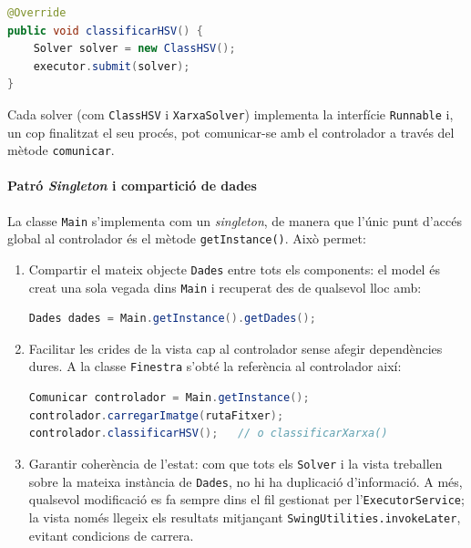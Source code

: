 \documentclass{ieeetj}
\begin{document}
\begin{lstlisting}[language=Java]
@Override
public void classificarHSV() {
    Solver solver = new ClassHSV();
    executor.submit(solver);
}
\end{lstlisting}

Cada solver (com \texttt{ClassHSV} i \texttt{XarxaSolver}) implementa la interfície \texttt{Runnable} i, un cop finalitzat el seu procés, pot comunicar-se amb el controlador a través del mètode \texttt{comunicar}.

\paragraph{Patró \emph{Singleton} i compartició de dades}

La classe \texttt{Main} s’implementa com un \emph{singleton}, de manera que
l’únic punt d’accés global al controlador és el mètode
\texttt{getInstance()}.  
Això permet:

\begin{enumerate}
  \item Compartir el mateix objecte \texttt{Dades} entre tots els components:
        el model és creat una sola vegada dins \texttt{Main} i recuperat des
        de qualsevol lloc amb:
\begin{lstlisting}[language=Java]
Dades dades = Main.getInstance().getDades();
\end{lstlisting}

  \item Facilitar les crides de la vista cap al controlador sense afegir
        dependències dures.  A la classe \texttt{Finestra} s’obté la referència
        al controlador així:

\begin{lstlisting}[language=Java]
Comunicar controlador = Main.getInstance();
controlador.carregarImatge(rutaFitxer);
controlador.classificarHSV();   // o classificarXarxa()
\end{lstlisting}

  \item Garantir coherència de l’estat: com que tots els \texttt{Solver} i la
        vista treballen sobre la mateixa instància de \texttt{Dades}, no hi ha
        duplicació d’informació.  A més, qualsevol modificació es fa sempre
        dins el fil gestionat per l’\texttt{ExecutorService}; la vista només
        llegeix els resultats mitjançant \texttt{SwingUtilities.invokeLater},
        evitant condicions de carrera.
\end{enumerate}
\end{document}
